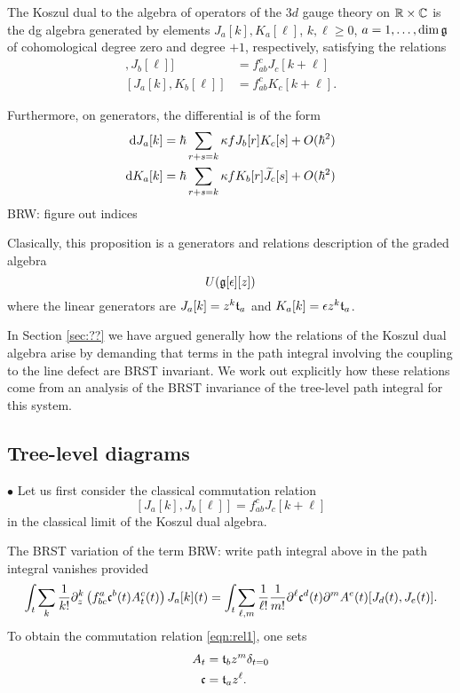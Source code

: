 \documentclass[11pt]{amsart}
\def\brian#1{{\textcolor{blue!65!red}{BRW: {#1}}}}
\begin{document}
\begin{prop}
The Koszul dual to the algebra of operators of the $3d$ gauge theory on $\mathbb R \times \mathbb C$ is the dg algebra generated by elements $J_a[k],K_a [\ell]$, $k,\ell \geq 0$, $a = 1,\ldots, \dim \mathfrak g$ of cohomological degree zero and degree $+1$, respectively, satisfying the relations
\begin{align*}
[J_a [k] , J_b [\ell]] & = f_{ab}^c J_{c} [k+\ell] \\
[J_a [k], K_b[\ell]] & = f_{ab}^c K_c [k+\ell] .
\end{align*} 

Furthermore, on generators, the differential is of the form
\begin{align*}
{\rm d} J_a[k] & = \hbar \sum_{r + s = k} \kappa f J_b[r] K_c[s] + O(\hbar^2) \\
{\rm d} K_a[k] & = \hbar \sum_{r + s = k} \kappa f K_b[r] \widetilde{J}_c[s] + O(\hbar^2)
\end{align*} 
\brian{figure out indices}
\end{prop}

Clasically, this proposition is a generators and relations description of the graded algebra 
\[
U(\mathfrak g[\epsilon][z])
\]
where the linear generators are $J_a[k] = z^k \mathfrak t_a$ and $K_a [k] = \epsilon z^k \mathfrak t_a$. 


In Section \ref{sec:??} we have argued generally how the relations of the Koszul dual algebra arise by demanding that terms in the path integral involving the coupling to the line defect are BRST invariant. 
We work out explicitly how these relations come from an analysis of the BRST invariance of the tree-level path integral for this system.

\subsection*{Tree-level diagrams}

$\bullet$
Let us first consider the classical commutation relation 
\begin{equation}\label{eqn:rel1}
[J_a [k] , J_b [\ell]] = f_{ab}^c J_{c} [k+\ell] 
\end{equation}
in the classical limit of the Koszul dual algebra. 

The BRST variation of the term \brian{write path integral above} in the path integral vanishes provided
\[
\int_t \sum_k \frac1{k!} \partial_z^k \left(f_{bc}^a \mathfrak c^b(t) A^c_t (t) \right) J_a[k] (t) = \int_t \sum_{\ell,m} \frac1{\ell!} \frac1{m!} \partial^\ell \mathfrak c^d (t) \partial^m A^e (t) [J_d (t), J_e(t)]  .
\] 
To obtain the commutation relation \eqref{eqn:rel1}, one sets 
\begin{align*}
A_t & = \mathfrak t_b z^{m} \delta_{t=0} \\
\mathfrak c & = \mathfrak t_a z^\ell .
\end{align*}
\end{document}
